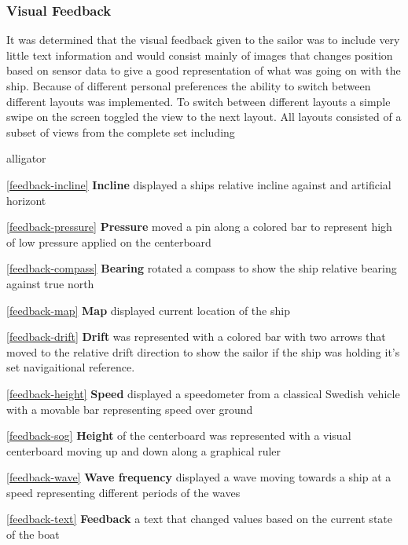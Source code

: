 \subsubsection{Visual Feedback}
It was determined that the visual feedback given to the sailor was to include very little text information and would consist mainly of images that changes position based on sensor data to give a good representation of what was going on with the ship. Because of different personal preferences the ability to switch between different layouts was implemented. To switch between different layouts a simple swipe on the screen toggled the view to the next layout. All layouts consisted of a subset of views from the complete set including
\begin{labeling}{alligator}
\item [\ref{feedback-incline} \textbf{Incline}]  displayed a ships relative incline against and artificial horizont
\item [\ref{feedback-pressure} \textbf{Pressure}] moved a pin along a colored bar to represent high of low pressure applied on the centerboard
\item [\ref{feedback-compass} \textbf{Bearing}] rotated a compass to show the ship relative bearing against true north
\item [\ref{feedback-map} \textbf{Map}] displayed current location of the ship
\item [\ref{feedback-drift} \textbf{Drift}] was represented with a colored bar with two arrows that moved to the relative drift direction to show the sailor if the ship was holding it's set navigaitional reference.
\item [\ref{feedback-height} \textbf{Speed}] displayed a speedometer from a classical Swedish vehicle\cite{volvo} with a movable bar representing speed over ground
\item [\ref{feedback-sog} \textbf{Height}] of the centerboard was represented with a visual centerboard moving up and down along a graphical ruler
\item [\ref{feedback-wave} \textbf{Wave frequency}] displayed a wave moving towards a ship at a speed representing different periods of the waves
\item [\ref{feedback-text} \textbf{Feedback}] a text that changed values based on the current state of the boat
\end{labeling}

